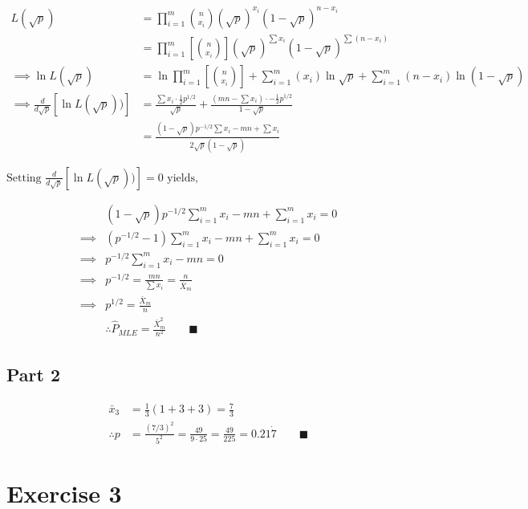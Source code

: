 \documentclass{article}
\begin{document}
$$
\begin{aligned}
L(\sqrt{ p }) &= \prod_{i=1}^{m} \binom{n}{x_{i}} (\sqrt{ p })^{x_{i}}(1-\sqrt{ p })^{n-x_{i}} \\
&= \prod_{i=1}^m \left[ \binom{n}{x_{i}}\right] (\sqrt{ p })^{\sum x_{i}}(1-\sqrt{ p })^{\sum (n-x_{i})} \\
\implies \ln{L(\sqrt{ p })} &= \ln{\prod_{i=1}^m \left[ \binom{n}{x_{i}}\right]} + \sum_{i=1}^m{(x_i)}\ln{\sqrt{ p }}+\sum_{i=1}^m{(n-x_{i})}\ln{(1-\sqrt{p})} \\
\implies \frac{d}{d\sqrt{ p }}[\ln{L(\sqrt{ p })})] &= \frac{\sum x_{i} \cdot \frac{1}{2} p^{1/2}}{\sqrt{ p }} + \frac{\left( mn - \sum x_{i} \right) \cdot -\frac{1}{2} p^{1/2}}{1 - \sqrt{ p }} \\
&= \frac{(1-\sqrt{ p })p^{-1/2} \sum x_{i} - mn + \sum x_{i}}{2\sqrt{ p } (1-\sqrt{ p })}
\end{aligned}
$$

$\text{Setting } \frac{d}{d\sqrt{ p }}[\ln{L(\sqrt{ p })})]  = 0 \text{ yields,}$

$$
\begin{aligned}
&(1-\sqrt{ p })p^{-1/2} \sum_{i=1}^m x_{i} - mn + \sum_{i=1}^m x_{i} = 0 \\
\implies &(p^{-1/2} - 1) \sum_{i=1}^m x_{i} - mn + \sum_{i=1}^m x_{i} = 0 \\
\implies &p^{-1/2} \sum_{i=1}^m x_{i} - mn = 0 \\
\implies &p^{-1/2} = \frac{mn}{\sum x_{i}} = \frac{n}{\bar{X}_{m}} \\
\implies &p^{1/2} = \frac{\bar{X}_{m}}{n} \\
& \therefore \hat{P}_{MLE} = \frac{\bar{X}_{m}^2}{n^2} \qquad \blacksquare
\end{aligned}
$$

\subsection*{Part 2}
$$
\begin{aligned}
\bar{x}_{3} &= \frac{1}{3} (1 + 3 + 3) = \frac{7}{3} \\
\therefore p &= \frac{(7/3)^2}{5^2} = \frac{49}{9 \cdot 25} = \frac{49}{225} = 0.21\dot{7} \qquad \blacksquare
\end{aligned}
$$


\newpage
\section*{Exercise 3}
\end{document}
